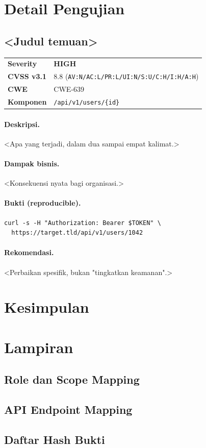 \documentclass[11pt,a4paper]{article}
\newcommand{\severity}[2]{\colorbox{#1}{\color{white}\textbf{\small #2}}}
\newcommand{\riskhigh}[1]{\severity{sevhigh}{#1}}
\begin{document}
\section{Detail Pengujian}
\subsection{<Judul temuan>}

\begin{longtable}{@{}p{3.4cm}p{11cm}@{}}
\toprule
\textbf{Severity}   & \riskhigh{HIGH} \\
\textbf{CVSS v3.1}  & 8.8 (\texttt{AV:N/AC:L/PR:L/UI:N/S:U/C:H/I:H/A:H}) \\
\textbf{CWE}        & CWE-639 \\
\textbf{Komponen}   & \texttt{/api/v1/users/\{id\}} \\
\bottomrule
\end{longtable}

\paragraph{Deskripsi.} <Apa yang terjadi, dalam dua sampai empat kalimat.>

\paragraph{Dampak bisnis.} <Konsekuensi nyata bagi organisasi.>

\paragraph{Bukti (reproducible).}
\begin{lstlisting}
curl -s -H "Authorization: Bearer $TOKEN" \
  https://target.tld/api/v1/users/1042
\end{lstlisting}

\paragraph{Rekomendasi.} <Perbaikan spesifik, bukan "tingkatkan keamanan".>

\section{Kesimpulan}

\appendix
\section{Lampiran}
\subsection{Role dan Scope Mapping}
\subsection{API Endpoint Mapping}
\subsection{Daftar Hash Bukti}
\end{document}
